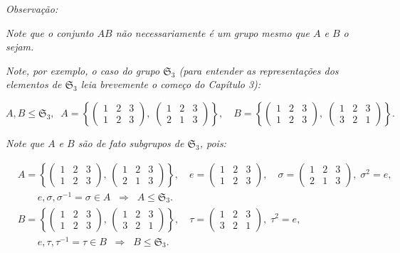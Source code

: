 \documentclass[16pt,openany]{book}
\theoremstyle{definition}
\begin{document}
\textit{Observação:}

\textit{Note que o conjunto $AB$ não necessariamente é um grupo mesmo que $A$ e $B$ o sejam.}

\textit{Note, por exemplo, o caso do grupo $\mathfrak{S}_3$ (para entender as representações dos elementos de $\mathfrak{S}_3$ leia brevemente o começo do Capítulo 3):}

\[
A, B \leq \mathfrak{S}_3, \; \; A = \left\{
  \begin{pmatrix}
    1 & 2 & 3 \\[4pt]
    1 & 2 & 3
  \end{pmatrix},
  \;
  \begin{pmatrix}
    1 & 2 & 3 \\[4pt]
    2 & 1 & 3
  \end{pmatrix}
\right\},
\quad
B = \left\{
  \begin{pmatrix}
    1 & 2 & 3 \\[4pt]
    1 & 2 & 3
  \end{pmatrix},
  \;
  \begin{pmatrix}
    1 & 2 & 3 \\[4pt]
    3 & 2 & 1
  \end{pmatrix}
\right\}.
\]

\textit{Note que $A$ e $B$ são de fato subgrupos de $\mathfrak{S}_3$, pois:}

\[
\begin{aligned}
& A = \left\{
  \begin{pmatrix}
    1 & 2 & 3 \\[4pt]
    1 & 2 & 3
  \end{pmatrix},\,
  \begin{pmatrix}
    1 & 2 & 3 \\[4pt]
    2 & 1 & 3
  \end{pmatrix}
\right\}, 
\quad
e = \begin{pmatrix}
1 & 2 & 3 \\[4pt]
1 & 2 & 3
\end{pmatrix}, 
\quad
\sigma = \begin{pmatrix}
1 & 2 & 3 \\[4pt]
2 & 1 & 3
\end{pmatrix}, 
\; \sigma^2 = e, 
\\
&\qquad e,\sigma,\sigma^{-1}=\sigma \in A 
\;\;\Longrightarrow\;\; A \le \mathfrak{S}_3. 
\\
& B = \left\{
  \begin{pmatrix}
    1 & 2 & 3 \\[4pt]
    1 & 2 & 3
  \end{pmatrix},\,
  \begin{pmatrix}
    1 & 2 & 3 \\[4pt]
    3 & 2 & 1
  \end{pmatrix}
\right\}, 
\quad
\tau = \begin{pmatrix}
1 & 2 & 3 \\[4pt]
3 & 2 & 1
\end{pmatrix}, 
\; \tau^2 = e, 
\\
&\qquad e,\tau,\tau^{-1}=\tau \in B 
\;\;\Longrightarrow\;\; B \le \mathfrak{S}_3.
\end{aligned}
\]
\end{document}
